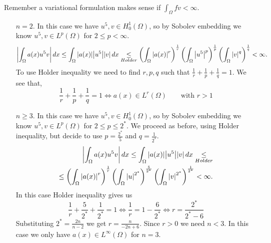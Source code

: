     Remember a variational formulation makes sense if \(\int_\Omega fv < \infty\).
    \begin{itemize}
        \item[\(n = 2\).] In this case we have \(u^5, v \in H^1_0(\Omega)\), so by Sobolev embedding we know \(u^5, v \in L^p(\Omega)\) for \(2 \leq p < \infty\). 
        \[
            \abs{\int_\Omega a(x) u^5 v}  \, dx \leq \int_\Omega \abs{a(x)} \abs{u^5} \abs{v} \, dx \underset{Holder}{\leq} \left(\int_\Omega \abs{a(x)}^r\right)^{\frac{1}{r}} \left(\int_\Omega \abs{u^5}^p \right)^{\frac{1}{p}} \left(\int_\Omega \abs{v}^q \right)^{\frac{1}{q}} < \infty.
        \]
        To use Holder inequality we need to find \(r, p, q\) such that \(\frac{1}{r} + \frac{1}{p} + \frac{1}{q} = 1\). We see that, 
        \[
            \frac{1}{r} + \frac{1}{p} + \frac{1}{q} = 1 \iff a(x) \in L^r(\Omega) \qquad \text{with } r > 1
        \]
        \item[\(n \geq 3\).] In this case we have \(u^5, v \in H^1_0(\Omega)\), so by Sobolev embedding we know \(u^5, v \in L^p(\Omega)\) for \(2 \leq p \leq 2^*\).
        We proceed as before, using Holder inequality, but decide to use \(p = \frac{2^*}{5}\) and \(q = \frac{1}{2^*}.\)
        \[
            \begin{split}
                \abs{\int_\Omega a(x) u^5 v}  \, dx \leq \int_\Omega \abs{a(x)} \abs{u^5} \abs{v} \, dx \underset{{Holder}}{\leq} \\
                \leq \left(\int_\Omega \abs{a(x)}^r\right)^{\frac{1}{r}} \left(\int_\Omega \abs{u}^{2^*} \right)^{\frac{5}{2^*}} \left(\int_\Omega \abs{v}^{2^*} \right)^{\frac{1}{2^*}} < \infty.
            \end{split}
        \]
        In this case Holder inequality gives us 
        \[
            \frac{1}{r} + \frac{5}{2^*} + \frac{1}{2^*} = 1 \iff \frac{1}{r} = 1 - \frac{6}{2^*} \iff r = \frac{2^*}{2^*-6}
        \]
        Substituting \(2^* = \frac{2n}{n - 2}\) we get \(r = \frac{n}{-2n + 6}\). Since \(r > 0\) we need \(n < 3\).
        In this case we only have \(a(x) \in L^\infty(\Omega)\) for \(n = 3\).
    \end{itemize}
    \newpage
    
